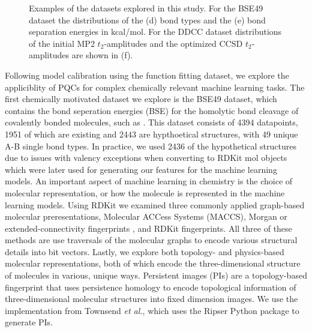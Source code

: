 \documentclass[journal=jacsat,manuscript=article]{achemso}
\begin{document}
\begin{figure}[H]
\begin{subfigure}[b]{0.3\textwidth}
		\caption{}
		\label{fig:waterddccdistribution}
	\end{subfigure}	
	\caption{Examples of the datasets explored in this study. For the BSE49 dataset the distributions of the (d) bond types and the (e) bond separation energies in kcal/mol. For the DDCC dataset distributions of the initial MP2 $t_{2}$-amplitudes and the optimized CCSD $t_{2}$-amplitudes are shown in (f).}
	\label{fig:bse_data}
\end{figure}







Following model calibration using the function fitting dataset, we explore the appliciblity of PQCs for complex chemically relevant machine learning tasks.
The first chemically motivated dataset we explore is the BSE49 dataset, which contains the bond seperation energies (BSE)  for the homolytic bond cleavage of covalently bonded molecules, such as .\cite{prasad_bse49_2021}
This dataset consists of 4394 datapoints, 1951 of which are existing and 2443 are hypthoetical structures, with 49 unique A-B single bond types.
In practice, we used 2436 of the hypothetical structures due to issues with valency exceptions when converting to RDKit mol objects which were later used for generating our features for the machine learning models.
An important aspect of machine learning in chemistry is the choice of molecular representation, or how the molecule is represented in the machine learning models.\cite{jones_molecular_2023}
Using RDKit\cite{noauthor_rdkit_nodate} we examined three commonly applied graph-based molecular preresentations, Molecular ACCess Systems (MACCS)\cite{durant_reoptimization_2002}, Morgan or extended-connectivity fingerprints \cite{morgan_generation_1965,rogers_extended-connectivity_2010}, and RDKit fingerprints.
All three of these methods are use traversals of the molecular graphs to encode various structural details into bit vectors.
Lastly, we explore both topology- and physics-based molecular representations, both of which encode the three-dimensional structure of molecules in various, unique ways.
Persistent images (PIs) are a topology-based fingerprint that uses persistence homology to encode topological information of three-dimensional molecular structures into fixed dimension images.\cite{adams_persistence_2017,townsend_representation_2020,schiff_augmenting_2022} 
We use the implementation from Townsend \textit{et al.}\cite{townsend_representation_2020}, which uses the Ripser Python package to generate PIs.\cite{tralie_ripserpy_2018}
\end{document}
